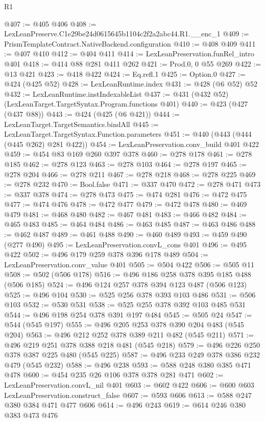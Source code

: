 \begin{lexlean}{R1}
\begin{coremodule}
@407 := @405 @406
@408 := LexLeanPreserve.C1e29be24d0615645b1104c2f2a2abc44.R1.__enc_1
@409 := PrismTemplateContract.NativeBackend.configuration
@410 := @408 @409
@411 := @407 @410
@412 := @404 @411
@414 := LexLeanPreservation.funRel_intro @401
@418 := @414 @88 @281 @411 @262
@421 := Prod.{0, 0} @55 @269
@422 := @13 @421
@423 := @418 @422
@424 := Eq.refl.{1}
@425 := Option.{0}
@427 := @424 (@425 @52)
@428 := LexLeanRuntime.index
@431 := @428 (@6 @52) @52
@432 := LexLeanRuntime.instIndexableList
@437 := @431 (@432 @52) (LexLeanTarget.TargetSyntax.Program.functions @401)
@440 := @423 (@427 (@437 @88))
@443 := @424 (@425 (@6 @421))
@444 := LexLeanTarget.TargetSemantics.bindAll
@445 := LexLeanTarget.TargetSyntax.Function.parameters
@451 := @440 (@443 (@444 (@445 @262) @281 @422))
@454 := LexLeanPreservation.conv_build @401 @422
@459 := @454 @83 @169 @260 @397 @378
@460 := @278 @178
@461 := @278 @185
@462 := @278 @123
@463 := @278 @103
@464 := @278 @197
@465 := @278 @204
@466 := @278 @211
@467 := @278 @218
@468 := @278 @225
@469 := @278 @232
@470 := Bool.false
@471 := @337 @470
@472 := @278 @471
@473 := @337 @378
@474 := @278 @473
@475 := @474 @281
@476 := @472 @475
@477 := @474 @476
@478 := @472 @477
@479 := @472 @478
@480 := @469 @479
@481 := @468 @480
@482 := @467 @481
@483 := @466 @482
@484 := @465 @483
@485 := @464 @484
@486 := @463 @485
@487 := @463 @486
@488 := @462 @487
@489 := @461 @488
@490 := @460 @489
@493 := @459 @490 (@277 @490)
@495 := LexLeanPreservation.convL_cons @401
@496 := @495 @422
@502 := @496 @179 @259 @378 @396 @178 @489
@504 := LexLeanPreservation.conv_value @401
@505 := @504 @422
@506 := @505 @11
@508 := @502 (@506 @178)
@516 := @496 @186 @258 @378 @395 @185 @488 (@506 @185)
@524 := @496 @124 @257 @378 @394 @123 @487 (@506 @123)
@525 := @496 @104
@530 := @525 @256 @378 @393 @103 @486
@531 := @506 @103
@532 := @530 @531
@538 := @525 @255 @378 @392 @103 @485 @531
@544 := @496 @198 @254 @378 @391 @197 @484
@545 := @505 @24
@547 := @544 (@545 @197)
@555 := @496 @205 @253 @378 @390 @204 @483 (@545 @204)
@563 := @496 @212 @252 @378 @389 @211 @482 (@545 @211)
@571 := @496 @219 @251 @378 @388 @218 @481 (@545 @218)
@579 := @496 @226 @250 @378 @387 @225 @480 (@545 @225)
@587 := @496 @233 @249 @378 @386 @232 @479 (@545 @232)
@588 := @496 @238
@593 := @588 @248 @380 @385 @471 @478
@600 := @454 @235 @26 @106 @378 @378 @281 @471
@602 := LexLeanPreservation.convL_nil @401
@603 := @602 @422
@606 := @600 @603 LexLeanPreservation.construct_false
@607 := @593 @606
@613 := @588 @247 @380 @384 @471 @477 @606
@614 := @496 @243
@619 := @614 @246 @380 @383 @473 @476

\end{coremodule}
\end{lexlean}
